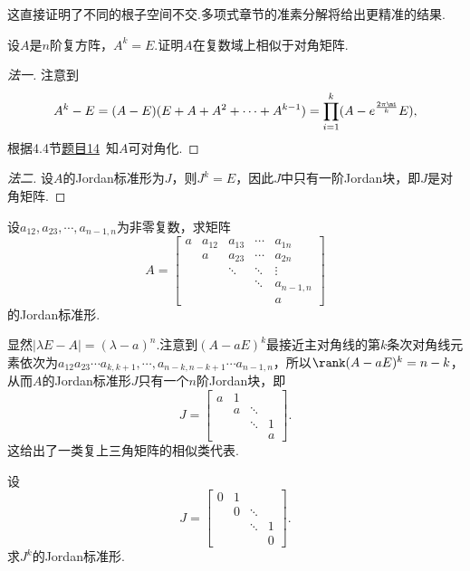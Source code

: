 \begin{note}
	这直接证明了不同的根子空间不交.多项式章节的准素分解将给出更精准的结果.
\end{note}
\begin{prob}[5]
	设$A$是$n$阶复方阵，$A^k=E$.证明$A$在复数域上相似于对角矩阵.
\end{prob}
\begin{proof}[法一]
	注意到
	\[
		A^k-E=(A-E)(E+A+A^2+\cdots+A^{k-1})=\prod_{i=1}^k(A-e^{\frac{2\pi\mi}{k}}E),
	\]
	根据4.4节\hyperlink{ConditionOfDiagonalized}{题目14}~知$A$可对角化.
\end{proof}
\begin{proof}[法二]
	设$A$的Jordan标准形为$J$，则$J^k=E$，因此$J$中只有一阶Jordan块，即$J$是对角矩阵.
\end{proof}
\begin{prob}[7]
	设$a_{12},a_{23},\cdots,a_{n-1,n}$为非零复数，求矩阵
	\[
		A=\begin{bmatrix}
			a & a_{12} & a_{13} & \cdots & a_{1n}    \\
			  & a      & a_{23} & \cdots & a_{2n}    \\
			  &        & \ddots & \ddots & \vdots    \\
			  &        &        & \ddots & a_{n-1,n} \\
			  &        &        &        & a
		\end{bmatrix}
	\]
	的Jordan标准形.
\end{prob}
\begin{sol}
	显然$|\lambda E-A|=(\lambda-a)^n$.注意到$(A-aE)^k$最接近主对角线的第$k$条次对角线元素依次为$a_{12}a_{23}\cdots a_{k,k+1},\cdots,a_{n-k,n-k+1}\cdots a_{n-1,n}$，所以$\rank(A-aE)^k=n-k$，从而$A$的Jordan标准形$J$只有一个$n$阶Jordan块，即
	\[
		J=\begin{bmatrix}
			a & 1 &        &   \\
			  & a & \ddots &   \\
			  &   & \ddots & 1 \\
			  &   &        & a
		\end{bmatrix}.
	\]
	这给出了一类复上三角矩阵的相似类代表.
\end{sol}
\begin{prob}[8]
	设
	\[
		J=\begin{bmatrix}
			0 & 1 &        &   \\
			  & 0 & \ddots &   \\
			  &   & \ddots & 1 \\
			  &   &        & 0
		\end{bmatrix}.
	\]
	求$J^k$的Jordan标准形.
\end{prob}
